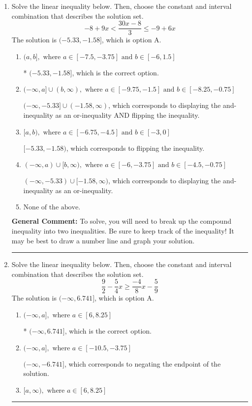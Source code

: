 \documentclass{extbook}[14pt]
\newcommand{\litem}[1]{\item #1

\rule{\textwidth}{0.4pt}}
\begin{document}
\begin{enumerate}\litem{
Solve the linear inequality below. Then, choose the constant and interval combination that describes the solution set.
\[ -8 + 9 x < \frac{30 x - 8}{3} \leq -9 + 6 x \]The solution is \( (-5.33, -1.58] \), which is option A.\begin{enumerate}[label=\Alph*.]
\item \( (a, b], \text{ where } a \in [-7.5, -3.75] \text{ and } b \in [-6, 1.5] \)

* $(-5.33, -1.58]$, which is the correct option.
\item \( (-\infty, a] \cup (b, \infty), \text{ where } a \in [-9.75, -1.5] \text{ and } b \in [-8.25, -0.75] \)

$(-\infty, -5.33] \cup (-1.58, \infty)$, which corresponds to displaying the and-inequality as an or-inequality AND flipping the inequality.
\item \( [a, b), \text{ where } a \in [-6.75, -4.5] \text{ and } b \in [-3, 0] \)

$[-5.33, -1.58)$, which corresponds to flipping the inequality.
\item \( (-\infty, a) \cup [b, \infty), \text{ where } a \in [-6, -3.75] \text{ and } b \in [-4.5, -0.75] \)

$(-\infty, -5.33) \cup [-1.58, \infty)$, which corresponds to displaying the and-inequality as an or-inequality.
\item \( \text{None of the above.} \)


\end{enumerate}

\textbf{General Comment:} To solve, you will need to break up the compound inequality into two inequalities. Be sure to keep track of the inequality! It may be best to draw a number line and graph your solution.
}
\litem{
Solve the linear inequality below. Then, choose the constant and interval combination that describes the solution set.
\[ \frac{9}{2} - \frac{5}{4} x \geq \frac{-4}{8} x - \frac{5}{9} \]The solution is \( (-\infty, 6.741] \), which is option A.\begin{enumerate}[label=\Alph*.]
\item \( (-\infty, a], \text{ where } a \in [6, 8.25] \)

* $(-\infty, 6.741]$, which is the correct option.
\item \( (-\infty, a], \text{ where } a \in [-10.5, -3.75] \)

 $(-\infty, -6.741]$, which corresponds to negating the endpoint of the solution.
\item \( [a, \infty), \text{ where } a \in [6, 8.25] \)


\end{enumerate}}
\end{enumerate}
\end{document}
